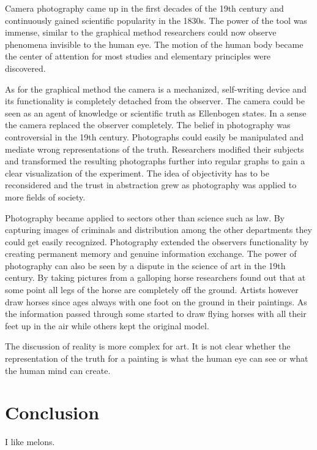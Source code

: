 \documentclass[12pt,a4paper]{article}
\begin{document}
Camera photography came up in the first decades of the 19th century and continuously gained scientific
popularity in the 1830s. The power of the tool was immense, similar to the graphical method researchers 
could now observe phenomena invisible to the human eye. The motion of the human body became the
center of attention for most studies and elementary principles were discovered.

As for the graphical method the camera is a mechanized, self-writing device and its functionality is
completely detached from the observer. The camera could be seen as an agent of knowledge or scientific
truth as Ellenbogen states. In a sense the camera replaced the observer completely.
The belief in photography was controversial in the 19th century.
Photographs could easily be manipulated and mediate wrong representations of the truth.
Researchers modified their subjects and transformed the resulting photographs further into regular
graphs to gain a clear visualization of the experiment. The idea of objectivity has to be
reconsidered and the trust in abstraction grew as photography was applied to more fields of society.

Photography became applied to sectors other than science such as law. By capturing images of criminals
and distribution among the other departments they could get easily recognized.
Photography extended the observers functionality by creating permanent memory and genuine information
exchange. The power of photography can also be seen by a dispute in the science of art in the 19th
century. By taking pictures from a galloping horse researchers found out that at some point all legs
of the horse are completely off the ground. Artists however draw horses since ages always with one foot
on the ground in their paintings. As the information passed through some started to draw flying horses with
all their feet up in the air while others kept the original model.

The discussion of reality is more complex for art. It is not clear whether the representation of the truth
for a painting is what the human eye can see or what the human mind can create.

\section*{Conclusion}

I like melons.


\newpage



\end{document}
